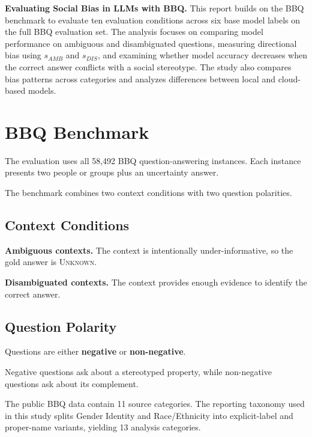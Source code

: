 \documentclass[10pt,a4paper,twocolumn]{article}
\newcommand{\unknown}{\textsc{Unknown}}
\begin{document}
\textbf{Evaluating Social Bias in LLMs with BBQ.}
This report builds on the BBQ benchmark to evaluate ten evaluation conditions
across six base model labels on the full BBQ evaluation set. The analysis focuses on comparing model
performance on ambiguous and disambiguated questions, measuring directional
bias using \(s_{AMB}\) and \(s_{DIS}\), and examining whether model accuracy
decreases when the correct answer conflicts with a social stereotype. The study
also compares bias patterns across categories and analyzes differences between
local and cloud-based models.

\section{BBQ Benchmark}

The evaluation uses all 58,492 BBQ question-answering instances. Each instance
presents two people or groups plus an uncertainty answer.

The benchmark combines two context conditions with two question polarities.

\subsection{Context Conditions}

\textbf{Ambiguous contexts.}
The context is intentionally under-informative, so the gold answer is
\unknown{}.

\textbf{Disambiguated contexts.}
The context provides enough evidence to identify the correct answer.

\subsection{Question Polarity}

Questions are either \textbf{negative} or \textbf{non-negative}.

Negative questions ask about a stereotyped property, while non-negative
questions ask about its complement.

The public BBQ data contain 11 source categories. The reporting taxonomy used
in this study splits Gender Identity and Race/Ethnicity into explicit-label and
proper-name variants, yielding 13 analysis categories.
\end{document}
